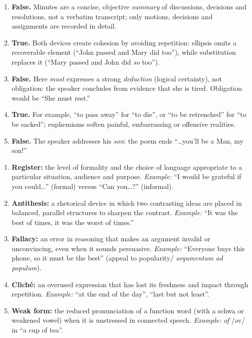 \documentclass[11pt]{article}
\begin{document}
\begin{corrige}
\begin{enumerate}
\item \textbf{False.} Minutes are a concise, objective \emph{summary} of discussions, decisions and resolutions, not a verbatim transcript; only motions, decisions and assignments are recorded in detail.
\item \textbf{True.} Both devices create cohesion by avoiding repetition: ellipsis omits a recoverable element (``John passed and Mary did too''), while substitution replaces it (``Mary passed and John did \emph{so} too'').
\item \textbf{False.} Here \emph{must} expresses a strong \emph{deduction} (logical certainty), not obligation: the speaker concludes from evidence that she is tired. Obligation would be ``She must rest.''
\item \textbf{True.} For example, ``to pass away'' for ``to die'', or ``to be retrenched'' for ``to be sacked''; euphemisms soften painful, embarrassing or offensive realities.
\item \textbf{False.} The speaker addresses his \emph{son}: the poem ends ``\ldots you'll be a Man, my son!''
\end{enumerate}
\end{corrige}

\begin{corrige}
\begin{enumerate}
\item \textbf{Register:} the level of formality and the choice of language appropriate to a particular situation, audience and purpose. \emph{Example:} ``I would be grateful if you could\ldots'' (formal) versus ``Can you\ldots?'' (informal).
\item \textbf{Antithesis:} a rhetorical device in which two contrasting ideas are placed in balanced, parallel structures to sharpen the contrast. \emph{Example:} ``It was the best of times, it was the worst of times.''
\item \textbf{Fallacy:} an error in reasoning that makes an argument invalid or unconvincing, even when it sounds persuasive. \emph{Example:} ``Everyone buys this phone, so it must be the best'' (appeal to popularity/ \emph{argumentum ad populum}).
\item \textbf{Clich\'e:} an overused expression that has lost its freshness and impact through repetition. \emph{Example:} ``at the end of the day'', ``last but not least''.
\item \textbf{Weak form:} the reduced pronunciation of a function word (with a schwa or weakened vowel) when it is unstressed in connected speech. \emph{Example:} \emph{of} /əv/ in ``a cup of tea''.
\end{enumerate}
\end{corrige}
\end{document}
